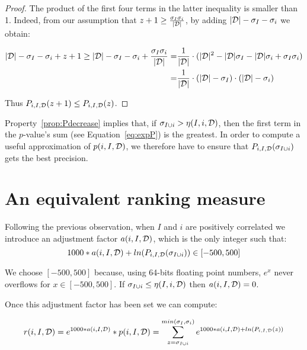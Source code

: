 \begin{proof}
The product of the first four terms in the latter inequality is smaller than 1.
Indeed, from our assumption that $z+1 \geq \frac{\sigma_I \sigma_i}{|{\cal D}|}$,
by adding $|{\cal D}|-\sigma_I -\sigma_i$ we obtain:

\begin{align*}
  |{\cal D}|-\sigma_I -\sigma_i + z + 1 \geq  |{\cal D}|-\sigma_I -\sigma_i + \frac{\sigma_I \sigma_i}{|{\cal D}|}
       = & \frac{1}{|{\cal D}|} \cdot (|{\cal D}|^2 - |{\cal D}|\sigma_I -|{\cal D}|\sigma_i + \sigma_I \sigma_i) \\
       = & \frac{1}{|{\cal D}|} \cdot (|{\cal D}| - \sigma_I) \cdot (|{\cal D}| -\sigma_i)
\end{align*}

Thus $P_{i,I,{\cal D}}(z+1) \leq P_{i,I,{\cal D}}(z)$.

\end{proof}

Property~\ref{prop:Pdecrease} implies that, if $\sigma_{I \cup i} > \eta(I,i,{\cal D})$,
then the first term in the $p$-value's sum (see Equation~\ref{eq:expP}) is the greatest.
In order to compute a useful approximation of $p(i,I,{\cal D})$,
we therefore have to ensure that $P_{i,I,{\cal D}}(\sigma_{I \cup i})$
gets the best precision.


\section{An equivalent ranking measure}
\label{sec:fisher:measure}

Following the previous observation,
when $I$ and $i$ are positively correlated
we introduce an adjustment factor $a(i,I,{\cal D})$,
which is the only integer such that:
\begin{equation}
	1000*a(i,I,{\cal D}) + ln(P_{i,I,{\cal D}}(\sigma_{I \cup i})) \in [-500, 500]
\end{equation}

We choose $[-500, 500]$ because,
using 64-bits floating point numbers,
$e^{x}$ never overflows for $x \in [-500, 500]$.
If $\sigma_{I \cup i} \le \eta(I,i,{\cal D})$ then $a(i,I,{\cal D}) = 0$.

Once this adjustment factor has been set
we can compute:

\begin{equation}
	\label{eq:expR}
	r(i,I,{\cal D}) =
	e^{1000*a(i,I,{\cal D})} * p(i,I,{\cal D}) =
		\sum_{z=\sigma_{I \cup i}}^{min(\sigma_{I}, \sigma_{i})}
					{  e^{ 1000*a(i,I,{\cal D}) + ln(P_{i,I,{\cal D}}(z))}  }
\end{equation}

